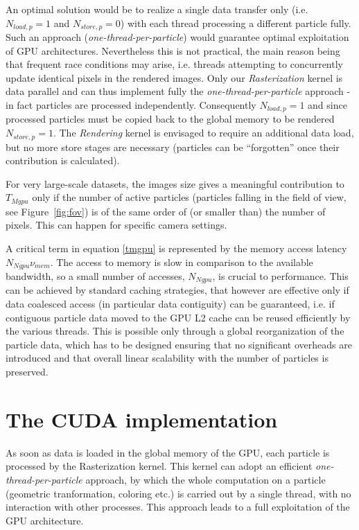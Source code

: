 \documentclass[1p]{elsarticle}
\begin{document}
An optimal solution would be to realize a single data transfer only
(i.e. $N_{load,p} = 1$ and $N_{store,p} = 0$) with each thread processing a different particle fully. Such an approach ({\it one-thread-per-particle}) would guarantee optimal exploitation of GPU architectures. Nevertheless this is not practical, the main reason being that frequent race conditions may arise, i.e. threads attempting to concurrently update identical pixels in the rendered images.
Only our {\it Rasterization} kernel is data parallel and can thus implement fully the {\it one-thread-per-particle} approach - in fact particles are processed independently. Consequently $N_{load,p} = 1$ and since processed particles must be copied back to the global memory to be rendered $N_{store,p} = 1$. The {\it Rendering} kernel is envisaged to require an additional data load, but no more store 
stages are necessary (particles can be ``forgotten'' once their contribution is calculated).

For very large-scale datasets, the images size gives a meaningful contribution to $T_{Mgpu}$ only if the number of active particles (particles falling in the field of view, see Figure~\ref{fig:fov}) is of the same order of (or smaller than) the number of pixels. This can happen for specific camera settings.

A critical term in equation \eqref{tmgpu} is represented by the memory access
latency $N_{Ngpu} \nu_{mem}$. The access to memory is slow in comparison to
the available bandwidth, so a small number of accesses, $N_{Ngpu}$, is crucial
to performance. This can be achieved by standard caching strategies, that
however are effective only if data coalesced access (in particular data contiguity) can be guaranteed, i.e. if contiguous particle data moved to the GPU L2 cache can be reused efficiently
by the various threads. This is possible only through a global reorganization 
of the particle data, which has to be designed ensuring that no significant overheads are introduced and  
that overall linear scalability with the number of particles is preserved.

\section{The CUDA implementation}
\label{sec:implementation}

As soon as data is loaded in the global memory of the GPU, each particle is processed 
by the Rasterization kernel. This kernel can adopt an efficient  
{\it one-thread-per-particle} approach, by which the whole computation on 
a particle (geometric tranformation, coloring etc.) is carried out
by a single thread, with no interaction with other processes.  
This approach leads to a full exploitation of the GPU architecture. 
\end{document}

